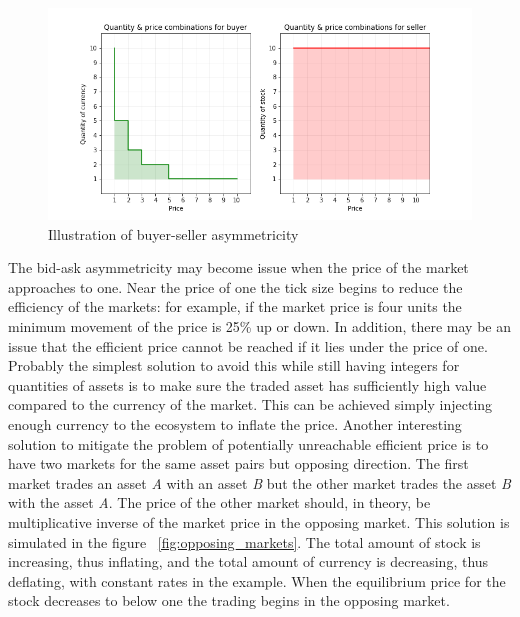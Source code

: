  \begin{figure}
    \includegraphics[width=\linewidth]{plots/buyer_seller_asymmetricity.png}
    \caption{Illustration of buyer-seller asymmetricity}
    \label{fig:buy_sell_asym}
\end{figure}

The bid-ask asymmetricity may become issue when the price of the market
approaches to one. Near the price of one the tick size begins to reduce the efficiency
of the markets: for example, if the market price is four units the minimum movement 
of the price is 25\% up or down. In addition, there may be an issue that the efficient
price cannot be reached if it lies under the price of one. Probably
the simplest solution to avoid this while still having integers for quantities %
of assets is to make sure the traded asset has sufficiently high value
compared to the currency of the market. This can be achieved simply injecting
enough currency to the ecosystem to inflate the price. Another interesting 
solution to mitigate the problem of potentially unreachable efficient price 
is to have two markets for the same asset pairs but opposing direction. 
The first market trades an asset \textit{A} with an asset \textit{B} but the 
other market trades the asset \textit{B} with the asset \textit{A}. 
The price of the other market should, in theory, be multiplicative inverse of 
the market price in the opposing market. This solution is simulated in the figure 
~\ref{fig:opposing_markets}. The total amount of stock is increasing, 
thus inflating, and the total amount of currency is decreasing, thus deflating, 
with constant rates in the example. When the equilibrium price for the stock 
decreases to below one the trading begins in the opposing market.

